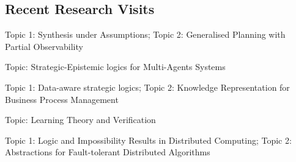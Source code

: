 \documentclass[10pt,a4paper,sans]{moderncv}
\begin{document}




\subsection{Recent Research Visits}

{Topic 1: Synthesis under Assumptions;
Topic 2: Generalised Planning with Partial Observability}{}{}{}


{Topic: Strategic-Epistemic logics for Multi-Agents Systems}{}{}{}

{Topic 1: Data-aware strategic logics;
Topic 2: Knowledge Representation for Business Process Management}{}{}{}


{Topic: Learning Theory and Verification}{}{}{}


{Topic 1: Logic and Impossibility Results in Distributed Computing;
Topic 2: Abstractions for Fault-tolerant Distributed Algorithms}{}{}{}
\end{document}
